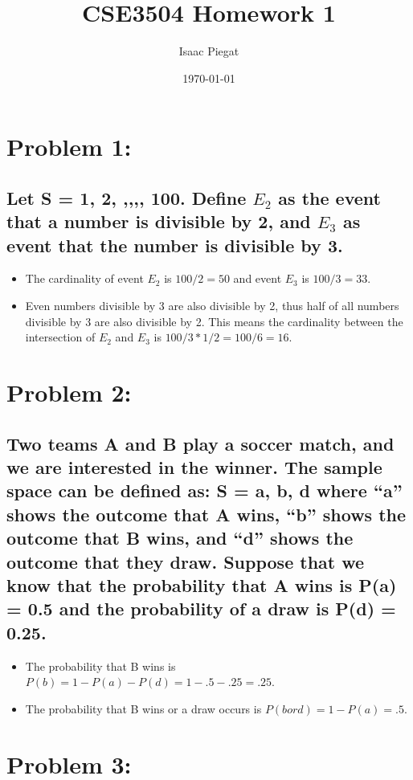 \documentclass{article} %
\title{CSE3504 Homework 1} %
\author{Isaac Piegat} %
\date{\today} %
\begin{document}
\maketitle %



\section{Problem 1:}
\subsection{Let S = {1, 2, ,,,, 100}. Define \(E_2\) as the event that a number is divisible by 2, and \(E_3\) as event that the number is divisible by 3.}
\begin{itemize}
    \item The cardinality of event \(E_2\) is \(100/2 = 50\) and event \(E_3\) is \(100/3 = 33\).
    \item Even numbers divisible by 3 are also divisible by 2, thus half of all numbers divisible by 3 
    are also divisible by 2. This means the cardinality between the intersection of \(E_2\) and \(E_3\) 
    is \(100/3 * 1/2 = 100/6 = 16\).
\end{itemize}

\section{Problem 2:}
\subsection{Two teams A and B play a soccer match, and we are interested in the winner. The sample
space can be defined as: S = {a, b, d} where “a” shows the outcome that A wins, “b” shows
the outcome that B wins, and “d” shows the outcome that they draw. Suppose that we know
that the probability that A wins is P(a) = 0.5 and the probability of a draw is P(d) = 0.25.}
\begin{itemize}
    \item The probability that B wins is \(P(b) = 1 - P(a) - P(d) = 1 - .5 - .25 = .25\).
    \item The probability that B wins or a draw occurs is \(P(b or d) = 1- P(a) = .5\).
\end{itemize}

\section{Problem 3:}
\end{document}
